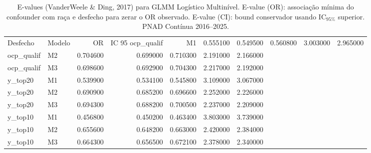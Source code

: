 \begin{table}
\caption{E-values (VanderWeele \& Ding, 2017) para GLMM Logístico Multinível. E-value (OR): associação mínima do confounder com raça e desfecho para zerar o OR observado. E-value (CI): bound conservador usando IC$_{95\%}$ superior. PNAD Contínua 2016--2025.}
\label{tab:evalues_glmm}
\begin{tabular}{llrrrrr}
\toprule
Desfecho & Modelo & OR & IC 95%
\midrule
ocp_qualif & M1 & 0.555100 & 0.549500 & 0.560800 & 3.003000 & 2.965000 \\
ocp_qualif & M2 & 0.704600 & 0.699000 & 0.710300 & 2.191000 & 2.166000 \\
ocp_qualif & M3 & 0.698600 & 0.692900 & 0.704300 & 2.217000 & 2.192000 \\
y_top20 & M1 & 0.539900 & 0.534100 & 0.545800 & 3.109000 & 3.067000 \\
y_top20 & M2 & 0.690900 & 0.685200 & 0.696600 & 2.252000 & 2.226000 \\
y_top20 & M3 & 0.694300 & 0.688200 & 0.700500 & 2.237000 & 2.209000 \\
y_top10 & M1 & 0.456800 & 0.450200 & 0.463400 & 3.803000 & 3.739000 \\
y_top10 & M2 & 0.655600 & 0.648200 & 0.663000 & 2.420000 & 2.384000 \\
y_top10 & M3 & 0.664300 & 0.656500 & 0.672100 & 2.378000 & 2.340000 \\
\bottomrule
\end{tabular}
\end{table}
